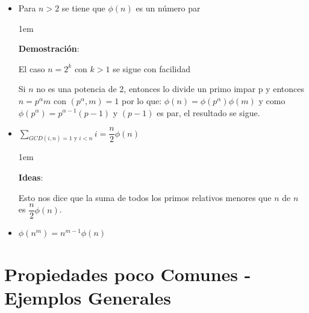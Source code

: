 \documentclass[12pt, fleqn]{report}                             %
\newenvironment{SmallIndentation}[1][0.75em]                    %
    {\begin{adjustwidth}{#1}{}\begin{footnotesize}}                 %
    {\end{footnotesize}\end{adjustwidth}}                           %
\begin{document}
\begin{itemize}
\begin{SmallIndentation}[1em]
                    \end{SmallIndentation}




                \clearpage
                \item Para $n > 2$ se tiene que $\phi(n)$ es un número par
                
                    \begin{SmallIndentation}[1em]
                        \textbf{Demostración}:

                        El caso $n = 2^k$ con $k > 1$ se sigue con facilidad

                        Si $n$ no es una potencia de 2, entonces lo divide un
                        primo impar p y entonces $n = p^\alpha m$ con $(p^\alpha, m) = 1$
                        por lo que:
                        $\phi(n) = \phi(p^\alpha)\phi(m)$ y como
                        $\phi(p^\alpha) = p^{\alpha-1}(p-1)$ y $(p-1)$ es par, el resultado se sigue.

                    \end{SmallIndentation}




                \item $\sum\limits_{GCD(i, n) = 1 \text{ y } i < n} i = \dfrac{n}{2} \phi(n)$
                    \begin{SmallIndentation}[1em]
                        \textbf{Ideas}:

                        Esto nos dice que la suma de todos los primos relativos menores que
                        $n$ de $n$ es $\dfrac{n}{2} \phi(n)$.

                    \end{SmallIndentation}

                \item $\phi(n^m) = n^{m-1} \phi(n)$

                \clearpage

                

            \end{itemize}



    \clearpage
    \section{Propiedades poco Comunes - Ejemplos Generales}
\end{document}
